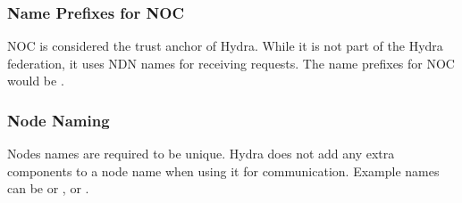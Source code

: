 
\subsubsection{Name Prefixes for NOC}

NOC is considered the trust anchor of Hydra. While it is not part of the Hydra federation, it uses NDN names for receiving requests. The name prefixes for NOC would be .




\subsubsection{Node Naming}


Nodes names are required to be unique. Hydra does not add any extra components to a node name when using it for communication. 
Example names can be
 or , or .


